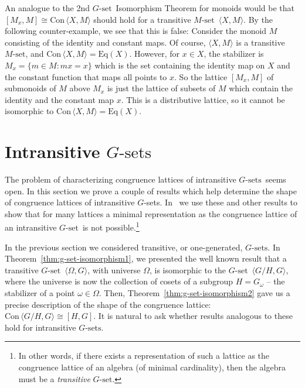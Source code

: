 \documentclass[cm,dissertation,actual,final]{uhthesis}
\theoremstyle{plain}
\theoremstyle{definition}
\theoremstyle{remark}
\numberwithin{theorem}{section}
\numberwithin{claim}{chapter}
\numberwithin{equation}{section}
\numberwithin{conjecture}{chapter}
\newcommand{\<}{\ensuremath{\langle}}
\renewcommand{\>}{\ensuremath{\rangle}}
\newcommand{\Eq}{\ensuremath{\mathrm{Eq}}}
\newcommand{\Con}{\ensuremath{\mathrm{Con\,}}}
\newcommand{\0}{\ensuremath{\mathbf{0}}}
\newcommand{\1}{\ensuremath{\mathbf{1}}}
\newcommand{\2}{\ensuremath{\mathbf{2}}}
\newcommand{\3}{\ensuremath{\mathbf{3}}}
\newcommand{\4}{\ensuremath{\mathbf{4}}}
\newcommand{\5}{\ensuremath{\mathbf{5}}}
\newcommand{\Gset}{\ensuremath{G\text{-set}}}
\newcommand{\Gsets}{\ensuremath{G\text{-sets}}}
\newcommand{\Mset}{\ensuremath{M\text{-set}}}
\newcommand{\la}{\langle}	     %
\newcommand{\ra}{\rangle}	     %
\begin{document}
  An analogue to the 2nd \Gset\ Isomorphism Theorem for monoids would be that
  $[M_x, M] \cong \Con\<X, M\>$ should hold for a transitive \Mset\ $\<X, M\>$.
  By the following counter-example, we see that this is false:
  Consider the monoid $M$ consisting of the identity and constant maps.  Of
  course, $\<X, M\>$ is a transitive \Mset, and $\Con\<X, M\> =
  \Eq(X)$. However, for $x\in X$, the stabilizer is  
  $M_x = \{m \in M: mx = x\}$ which is the set containing the identity map on $X$
  and the constant function that maps all points to $x$.
  So the lattice $[M_x, M]$ of submonoids of $M$ above $M_x$ is just the lattice
  of subsets of $M$ which contain the identity and the constant map $x$.  This is a
  distributive lattice, so it cannot be isomorphic to $\Con\<X, M\> = \Eq(X)$.


\section{Intransitive \Gsets}
\label{sec:congr-latt-intr}
The problem of characterizing congruence lattices of %
intransitive \Gsets\ seems open. 
In this section we prove a couple of results
which help determine the shape of 
congruence lattices of intransitive $G$-sets. 
In~\cite{gsets} we use these and other
results to show that for many lattices a minimal representation as the
congruence lattice of an intransitive \Gset\ is not possible.\footnote{In other
  words, if there exists a representation of such a lattice as the congruence
  lattice of an algebra (of minimal cardinality), then the
  algebra must be a \emph{transitive} \Gset.}

In the previous section we considered transitive, or one-generated, \Gsets.
In Theorem~\ref{thm:g-set-isomorphism1}, we presented the well known result that
a transitive \Gset\ $\<\Omega, G\>$, with universe $\Omega$, is isomorphic to the
\Gset\ $\<G/H, G\>$, where the universe is now the collection of cosets of
a subgroup $H= G_\omega$ -- the stabilizer of a point $\omega\in \Omega$.
Then, Theorem~\ref{thm:g-set-isomorphism2} gave us a precise 
description of the shape of the congruence lattice: $\Con\<G/H, G\> \cong [H,G]$. 
It is natural to ask whether results analogous to these 
hold for intransitive \Gsets.
\end{document}
